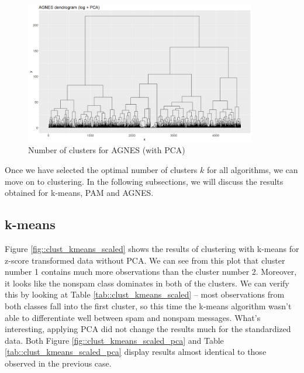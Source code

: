 \documentclass{article}
\begin{document}
	\begin{figure}[h]
		\centering
		\includegraphics[width=0.9\textwidth]{proj2_plots/dendro_log_pca.png}
		\caption{Number of clusters for AGNES (with PCA)}
		\label{fig::clust_num_agnes_log_pca}
	\end{figure}
	
	Once we have selected the optimal number of clusters $k$ for all algorithms, we can 
	move on to clustering. In the following subsections, we will discuss the results obtained for 
	k-means, PAM and AGNES.
	
	\subsection{k-means}

	Figure \ref{fig::clust_kmeans_scaled} shows the results of clustering with k-means for z-score transformed data without PCA.
	We can see from this plot that cluster number 1 contains much more observations than the cluster number 2.
	Moreover, it looks like the nonspam class dominates in both of the clusters. We can verify this by looking at Table \ref{tab::clust_kmeans_scaled} --
	most observations from both classes fall into the first cluster, so this time the k-means algorithm wasn't able to differentiate well between spam and nonspam messages.
	What's interesting, applying PCA did not change the results much for the standardized data. Both Figure \ref{fig::clust_kmeans_scaled_pca}
	and Table \ref{tab::clust_kmeans_scaled_pca} display results almost identical to those observed in the previous case. 
\end{document}
